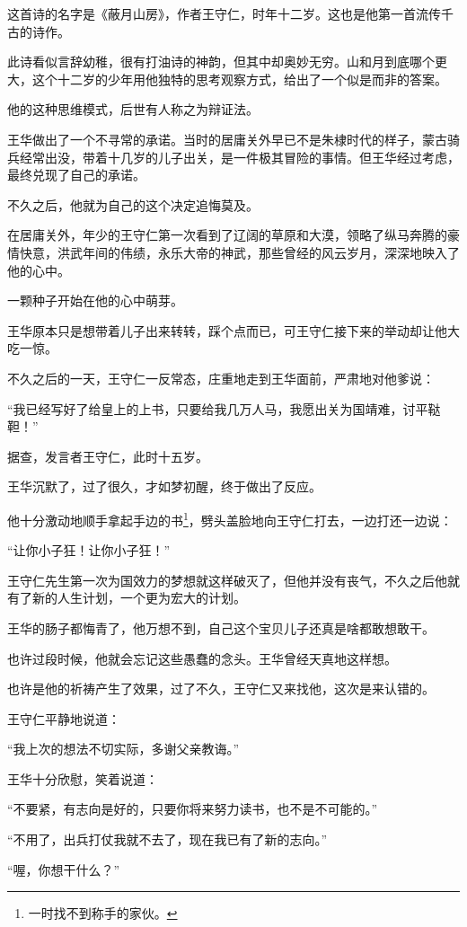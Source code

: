 \begin{multicols}{\theparacolNo}
		这首诗的名字是《蔽月山房》，作者王守仁，时年十二岁。这也是他第一首流传千古的诗作。

		此诗看似言辞幼稚，很有打油诗的神韵，但其中却奥妙无穷。山和月到底哪个更大，这个十二岁的少年用他独特的思考观察方式，给出了一个似是而非的答案。

		他的这种思维模式，后世有人称之为辩证法。

		王华做出了一个不寻常的承诺。当时的居庸关外早已不是朱棣时代的样子，蒙古骑兵经常出没，带着十几岁的儿子出关，是一件极其冒险的事情。但王华经过考虑，最终兑现了自己的承诺。

		不久之后，他就为自己的这个决定追悔莫及。

		在居庸关外，年少的王守仁第一次看到了辽阔的草原和大漠，领略了纵马奔腾的豪情快意，洪武年间的伟绩，永乐大帝的神武，那些曾经的风云岁月，深深地映入了他的心中。

		一颗种子开始在他的心中萌芽。

		王华原本只是想带着儿子出来转转，踩个点而已，可王守仁接下来的举动却让他大吃一惊。

		不久之后的一天，王守仁一反常态，庄重地走到王华面前，严肃地对他爹说：

		“我已经写好了给皇上的上书，只要给我几万人马，我愿出关为国靖难，讨平鞑靼！”

		据查，发言者王守仁，此时十五岁。

		王华沉默了，过了很久，才如梦初醒，终于做出了反应。

		他十分激动地顺手拿起手边的书\footnote{一时找不到称手的家伙。}，劈头盖脸地向王守仁打去，一边打还一边说：

		“让你小子狂！让你小子狂！”

		王守仁先生第一次为国效力的梦想就这样破灭了，但他并没有丧气，不久之后他就有了新的人生计划，一个更为宏大的计划。

		王华的肠子都悔青了，他万想不到，自己这个宝贝儿子还真是啥都敢想敢干。

		也许过段时候，他就会忘记这些愚蠢的念头。王华曾经天真地这样想。

		也许是他的祈祷产生了效果，过了不久，王守仁又来找他，这次是来认错的。

		王守仁平静地说道：

		“我上次的想法不切实际，多谢父亲教诲。”

		王华十分欣慰，笑着说道：

		“不要紧，有志向是好的，只要你将来努力读书，也不是不可能的。”

		“不用了，出兵打仗我就不去了，现在我已有了新的志向。”

		“喔，你想干什么？”


\end{multicols}
